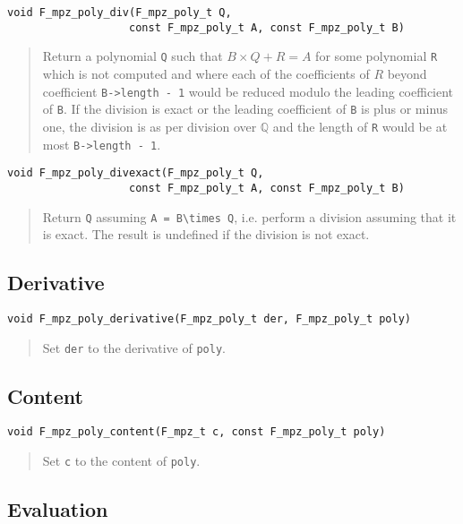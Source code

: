 \documentclass[a4paper,10pt]{article}
\newcommand{\Q}{\mathbb{Q}}
\newcommand{\code}{\lstinline}
\begin{document}
\begin{lstlisting}
void F_mpz_poly_div(F_mpz_poly_t Q, 
                   const F_mpz_poly_t A, const F_mpz_poly_t B)
\end{lstlisting}
\begin{quote}
Return a polynomial \code{Q} such that $B\times Q + R = A$ for some polynomial \code{R} which is not
computed and where each of the coefficients of $R$ beyond coefficient \code{B->length - 1} would be
reduced modulo the leading coefficient of \code{B}. If the division is exact or the leading coefficient 
of \code{B} is plus or minus one, the division is as per division over $\Q$ and the length of \code{R} 
would be at most \code{B->length - 1}.
\end{quote}

\begin{lstlisting}
void F_mpz_poly_divexact(F_mpz_poly_t Q, 
                   const F_mpz_poly_t A, const F_mpz_poly_t B)
\end{lstlisting}
\begin{quote}
Return \code{Q} assuming \code{A = B\times Q}, i.e. perform a division assuming that it is exact. The
result is undefined if the division is not exact.
\end{quote}

\subsection{Derivative}

\begin{lstlisting}
void F_mpz_poly_derivative(F_mpz_poly_t der, F_mpz_poly_t poly)
\end{lstlisting}
\begin{quote}
Set \code{der} to the derivative of \code{poly}.
\end{quote}

\subsection{Content}

\begin{lstlisting}
void F_mpz_poly_content(F_mpz_t c, const F_mpz_poly_t poly)
\end{lstlisting}
\begin{quote}
Set \code{c} to the content of \code{poly}.
\end{quote}

\subsection{Evaluation}
\end{document}
